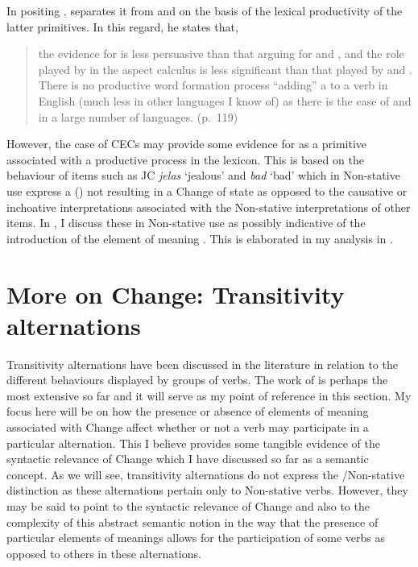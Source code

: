 In positing \DO, \citet{Dowty1979} separates it from \CAUSE and \BECOME
on the basis of the lexical productivity of the latter primitives. In
this regard, he states that,

\begin{quote}
the evidence for \DO is less persuasive than that arguing for \CAUSE and
\BECOME, and the role played by \DO in the aspect calculus is less
significant than that played by \CAUSE and \BECOME. There is no
productive word formation process “adding” a \DO to a verb in English
(much less in other languages I know of) as there is the case of \CAUSE
and \BECOME in a large number of languages. (p.~119)
\end{quote}

However, the case of CECs  may provide some
evidence for \DO as a primitive associated with a productive process in
the lexicon. This is based on the behaviour of items such as JC
\textit{jelas} `jealous' and \textit{bad} `bad' which in Non-stative
use express a  () not resulting in a Change of state as
opposed to the causative or inchoative interpretations associated with
the Non-stative interpretations of other items.  In , I
discuss these in Non-stative use as possibly indicative of the
introduction of the element of meaning \DO. This is elaborated in my
analysis in .

\section{More on Change: Transitivity alternations}\label{sec:4.4}

Transitivity alternations have been discussed in the literature in
relation to the different behaviours displayed by groups of verbs.
The work of \citet{Levin1993} is perhaps the most extensive so far and
it will serve as my point of reference in this section.  My focus here
will be on how the presence or absence of elements of meaning
associated with Change affect whether or not a verb may participate in
a particular alternation.  This I believe provides some tangible
evidence of the syntactic relevance of Change which I have discussed
so far as a semantic concept.  As we will see, transitivity
alternations do not express the \slash Non-stative distinction as
these alternations pertain only to Non-stative verbs.  However, they
may be said to point to the syntactic relevance of Change and also to
the complexity of this abstract semantic notion in the way that the
presence of particular elements of meanings allows for the
participation of some verbs as opposed to others in these
alternations.

